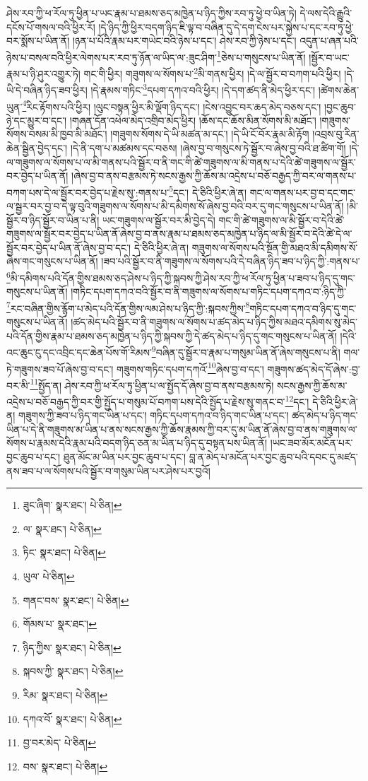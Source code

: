 ཤེས་རབ་ཀྱི་ཕ་རོལ་ཏུ་ཕྱིན་པ་ཡང་རྣམ་པ་ཐམས་ཅད་མཁྱེན་པ་ཉིད་ཀྱིས་རབ་ཏུ་ཕྱེ་བ་ཡིན་ཏེ། དེ་ལས་དེའི་རྒྱུའི་དངོས་པོ་གསལ་བའི་ཕྱིར་རོ། །དེ་ཉིད་ཀྱི་ཕྱིར་བདག་ཉིད་ཇི་ལྟ་བ་བཞིན་དུ་དེ་དག་ངེས་པར་སྐྱེས་པ་དང་རབ་ཏུ་ཕྱེ་བར་སྨོས་པ་ཡིན་ནོ། །ཉན་པ་པོའི་རྣམ་པར་གཡེང་བའི་ཉེས་པ་དང་། ཤེས་རབ་ཀྱི་ཉེས་པ་དང་། འདུན་པ་ཞན་པའི་ཉེས་པ་བསལ་བའི་ཕྱིར་ལེགས་པར་རབ་ཏུ་ཉོན་ལ་ཡིད་ལ་:ཟུང་ཤིག་\footnote{ཟུང་ཞིག་  སྣར་ཐང་།  པེ་ཅིན། }ཅེས་པ་གསུངས་པ་ཡིན་ནོ། །སྦྱོར་བ་ཡང་རྣམ་པ་ཉི་ཤུར་འགྱུར་ཏེ། གང་གི་ཕྱིར། གཟུགས་ལ་སོགས་པ་\footnote{ལ་  སྣར་ཐང་།  པེ་ཅིན། }མི་གནས་ཕྱིར། །དེ་ལ་སྦྱོར་བ་བཀག་པའི་ཕྱིར། །དེ་ཡི་དེ་བཞིན་ཉིད་ཟབ་ཕྱིར། །དེ་རྣམས་གཏིང་\footnote{ཏིང་  སྣར་ཐང་།  པེ་ཅིན། }དཔག་དཀའ་བའི་ཕྱིར། །དེ་དག་ཚད་ནི་མེད་ཕྱིར་དང་། །ཚེགས་ཆེན་ཡུན་\footnote{ཡུལ་  པེ་ཅིན། }རིང་རྟོགས་པའི་ཕྱིར། །ལུང་བསྟན་ཕྱིར་མི་ལྡོག་ཉིད་དང་། །ངེས་འབྱུང་བར་ཆད་མེད་བཅས་དང་། །བྱང་ཆུབ་ཉེ་དང་མྱུར་བ་དང་། །གཞན་དོན་འཕེལ་མེད་འགྲིབ་མེད་ཕྱིར། །ཆོས་དང་ཆོས་མིན་སོགས་མི་མཐོང་། །གཟུགས་སོགས་བསམ་མི་ཁྱབ་མི་མཐོང་། །གཟུགས་སོགས་དེ་ཡི་མཚན་མ་དང་། །དེ་ཡི་ངོ་བོར་རྣམ་མི་རྟོག །འབྲས་བུ་རིན་ཆེན་སྦྱིན་བྱེད་དང་། །དེ་ནི་དག་པ་མཚམས་དང་བཅས། །ཞེས་བྱ་བ་གསུངས་ཏེ་སྦྱོར་བ་ཞེས་བྱ་བའི་ཐ་ཚིག་གོ། །དེ་ལ་གཟུགས་ལ་སོགས་པ་ལ་མི་གནས་པའི་སྦྱོར་བ་ནི་གང་གི་ཚེ་གཟུགས་ལ་མི་གནས་པ་དེའི་ཚེ་གཟུགས་ལ་སྦྱོར་བར་བྱེད་པ་ཡིན་ནོ། །ཞེས་བྱ་བ་ནས་བརྩམས་ཏེ་སངས་རྒྱས་ཀྱི་ཆོས་མ་འདྲེས་པ་བཅོ་བརྒྱད་ཀྱི་བར་ལ་གནས་པ་བཀག་པས་དེ་ལ་སྦྱོར་བར་བྱེད་པ་རྗེས་སུ་:གནས་པ་\footnote{གནང་བས་  སྣར་ཐང་།  པེ་ཅིན། }དང་། དེ་ཅིའི་ཕྱིར་ཞེ་ན། གང་ལ་གནས་པར་བྱ་བ་དང་གང་ལ་སྦྱར་བར་བྱ་བ་དེ་ལྟ་བུའི་གཟུགས་ལ་སོགས་པ་མི་དམིགས་སོ་ཞེས་བྱ་བའི་བར་དུ་གང་གསུངས་པ་ཡིན་ནོ། །མི་སྦྱོར་བ་ཉིད་སྦྱོར་བ་ཡིན་པ་ནི། ཡང་གཟུགས་ལ་སྦྱོར་བར་མི་བྱེད་དེ། གང་གི་ཚེ་གཟུགས་ལ་མི་སྦྱོར་བ་དེའི་ཚེ་གཟུགས་ལ་སྦྱོར་བར་བྱེད་པ་ཡིན་ནོ་ཞེས་བྱ་བ་ནས་རྣམ་པ་ཐམས་ཅད་མཁྱེན་པ་ཉིད་ལ་མི་སྦྱོར་བ་དེའི་ཚེ་དེ་ལ་སྦྱོར་བར་བྱེད་པ་ཡིན་ནོ་ཞེས་བྱ་བ་དང་། དེ་ཅིའི་ཕྱིར་ཞེ་ན། གཟུགས་ལ་སོགས་པའི་སྔོན་གྱི་མཐའ་མི་དམིགས་སོ་ཞེས་གང་གསུངས་པ་ཡིན་ནོ། །ཟབ་པའི་སྦྱོར་བ་ནི་གཟུགས་ལ་སོགས་པའི་དེ་བཞིན་ཉིད་ཟབ་པ་ཉིད་ཀྱི་:གནས་པ་\footnote{གོམས་པ་  སྣར་ཐང་། }མི་དམིགས་པའི་དོན་གྱིས་ཐམས་ཅད་ཤེས་པ་ཉིད་ཀྱི་སྐབས་ཀྱི་ཤེས་རབ་ཀྱི་ཕ་རོལ་ཏུ་ཕྱིན་པ་ཟབ་པ་ཉིད་དུ་གང་གསུངས་པ་ཡིན་ནོ། །གཏིང་དཔག་དཀའ་བའི་སྦྱོར་བ་ནི་གཟུགས་ལ་སོགས་པ་གཏིང་དཔག་དཀའ་བ་:ཉིད་ཀྱི་\footnote{ཉིད་ཀྱིས་  སྣར་ཐང་།  པེ་ཅིན། }རང་བཞིན་གྱིས་རྙོག་པ་མེད་པའི་དོན་གྱིས་ལམ་ཤེས་པ་ཉིད་ཀྱི་:སྐབས་ཀྱིས་\footnote{སྐབས་ཀྱི་  སྣར་ཐང་།  པེ་ཅིན། }གཏིང་དཔག་དཀའ་བ་ཉིད་དུ་གང་གསུངས་པ་ཡིན་ནོ། །ཚད་མེད་པའི་སྦྱོར་བ་ནི་གཟུགས་ལ་སོགས་པ་ཚད་མེད་པ་ཉིད་ཀྱིས་མཐའ་དམིགས་སུ་མེད་པའི་དོན་གྱིས་རྣམ་པ་ཐམས་ཅད་མཁྱེན་པ་ཉིད་ཀྱི་སྐབས་ཀྱི་དེ་ཚད་མེད་པ་ཉིད་དུ་གང་གསུངས་པ་ཡིན་ནོ། །དེའི་འང་ཆུང་ངུ་དང་འབྲིང་དང་ཆེན་པོས་གོ་རིམས་\footnote{རིམ་  སྣར་ཐང་།  པེ་ཅིན། }བཞིན་དུ་སྦྱོར་བ་རྣམ་པ་གསུམ་ཡིན་ནོ་ཞེས་གསུངས་པ་ནི། གལ་ཏེ་གཟུགས་ཟབ་པོ་ཞེས་བྱ་བ་དང་། གཟུགས་གཏིང་དཔག་དཀའོ་\footnote{དཀའ་བོ་  སྣར་ཐང་།  པེ་ཅིན། }ཞེས་བྱ་བ་དང་། གཟུགས་ཚད་མེད་དོ་ཞེས་:བྱ་བར་མི་\footnote{བྱ་བར་མེད་  པེ་ཅིན། }སྤྱོད་ན། ཤེས་རབ་ཀྱི་ཕ་རོལ་ཏུ་ཕྱིན་པ་ལ་སྤྱོད་དོ་ཞེས་བྱ་བ་ནས་བརྩམས་ཏེ། སངས་རྒྱས་ཀྱི་ཆོས་མ་འདྲེས་པ་བཅོ་བརྒྱད་ཀྱི་བར་གྱི་སྤྱོད་པ་གསུམ་པོ་བཀག་པས་དེའི་སྤྱོད་པ་རྗེས་སུ་གནང་བ་\footnote{བས་  སྣར་ཐང་།  པེ་ཅིན། }དང་། དེ་ཅིའི་ཕྱིར་ཞེ་ན། གཟུགས་ཀྱི་ཟབ་པ་ཉིད་གང་ཡིན་པ་དང་། གཏིང་དཔག་དཀའ་བ་ཉིད་གང་ཡིན་པ་དང་། ཚད་མེད་པ་ཉིད་གང་ཡིན་པ་དེ་ནི་གཟུགས་མ་ཡིན་པ་ནས་སངས་རྒྱས་ཀྱི་ཆོས་རྣམས་ཀྱི་བར་དུ་མ་ཡིན་ནོ་ཞེས་བྱ་བ་ནས་གཟུགས་ལ་སོགས་པ་རྣམས་དེའི་རྣམ་པའི་བདག་ཉིད་ཅན་མ་ཡིན་པ་ཉིད་དུ་བསྟན་པས་ཡིན་ནོ། །ཡང་ཟབ་མོར་མངོན་པར་བྱང་ཆུབ་པ་དང་། ཐུན་མོང་མ་ཡིན་པར་བྱང་ཆུབ་པ་དང་། བླ་ན་མེད་པ་མངོན་པར་བྱང་ཆུབ་པའི་དབང་དུ་མཛད་ནས་ཟབ་པ་ལ་སོགས་པའི་སྦྱོར་བ་གསུམ་ཡིན་པར་ཤེས་པར་བྱའོ། 